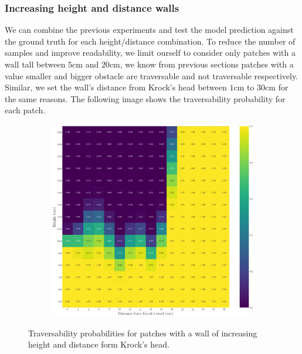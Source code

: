 \documentclass[../document.tex]{subfiles}
\begin{document}
\subsubsection{Increasing height and distance walls}
We can combine the previous experiments and test the model prediction against the ground truth for each height/distance combination. To reduce the number of samples and improve readability, we limit ourself to consider only patches with a wall tall between $5$cm and $20$cm, we know from previous sections patches with a value smaller and bigger obstacle are traversable and not traversable respectively. Similar, we set the wall's distance from Krock's head between $1$cm to $30$cm for the same reasons. The following image shows the traversability probability for each patch.
\begin{figure}[H]
    \centering
\begin{subfigure}[b]{1\textwidth}
    \includegraphics[width=\linewidth]{../img/5/custom_patches/walls_heights/walls_heights.png}
    \end{subfigure}
    \caption{Traversability probabilities for patches with a wall of increasing height and distance form Krock's head.}
\end{figure}


\end{document}
